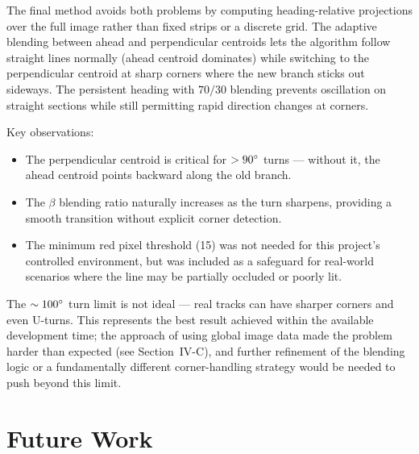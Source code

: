 \documentclass[conference, twocolumn]{IEEEtran}
\begin{document}
The final method avoids both problems by computing heading-relative projections over the full image rather than fixed strips or a discrete grid. The adaptive blending between ahead and perpendicular centroids lets the algorithm follow straight lines normally (ahead centroid dominates) while switching to the perpendicular centroid at sharp corners where the new branch sticks out sideways. The persistent heading with $70/30$ blending prevents oscillation on straight sections while still permitting rapid direction changes at corners.

Key observations:
\begin{itemize}
    \item The perpendicular centroid is critical for $>90\degree$ turns --- without it, the ahead centroid points backward along the old branch.
    \item The $\beta$ blending ratio naturally increases as the turn sharpens, providing a smooth transition without explicit corner detection.
    \item The minimum red pixel threshold (15) was not needed for this project's controlled environment, but was included as a safeguard for real-world scenarios where the line may be partially occluded or poorly lit.
\end{itemize}

The $\sim100\degree$ turn limit is not ideal --- real tracks can have sharper corners and even U-turns. This represents the best result achieved within the available development time; the approach of using global image data made the problem harder than expected (see Section~IV-C), and further refinement of the blending logic or a fundamentally different corner-handling strategy would be needed to push beyond this limit.

\section{Future Work}
\end{document}
